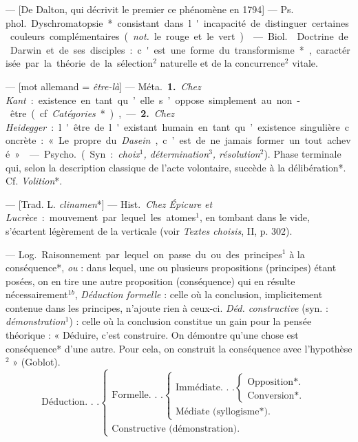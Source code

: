 
	\begin{itemize}[leftmargin=1cm, label=, itemsep=1pt]

 — [De Dalton, qui décrivit
le premier ce phénomène en 1794]
— \si{Ps. phol.} Dyschromatopsie* consistant dans l'incapacité de distinguer certaines couleurs complémentaires ({\it not.} le rouge et le vert).

 — \si{Biol.}  Doctrine de
Darwin et de ses disciples : c'est
une forme du transformisme*, caractérisée par la théorie de la sélection$^2$
naturelle et de la concurrence$^2$
vitale.

 — [mot allemand = {\it être-là}] —
\si{Méta.} {\bf 1.} {\it Chez Kant} : existence en
tant qu’elle s’oppose simplement au
non-être (cf. {\it Catégories}*), — {\bf 2.} {\it Chez
Heidegger} : l'être de l'existant
humain en tant qu’existence singulière concrète : « Le propre du {\it Dasein},
c’est de ne jamais former un tout
achevé. »

 — \si{Psycho.} (Syn. : {\it choix$^1$,
détermination$^3$, résolution}$^2$). Phase
terminale qui, selon la description
classique de l’acte volontaire, succède à la délibération*. Cf. {\it Volition}*.

 — [Trad. L. {\it clinamen}*] —
\si{Hist.} {\it Chez Épicure et Lucrèce} : mouvement par lequel les atomes$^1$, en
tombant dans le vide, s’écartent
légèrement de la verticale (voir
{\it Textes choisis}, II, p. 302).

 — \si{Log.} Raisonnement
par lequel on passe du ou des principes$^1$ à la conséquence*, {\it ou} : dans
lequel, une ou plusieurs propositions (principes) étant posées, on en
tire une autre proposition (conséquence) qui en résulte
nécessairement$^{1b}$, {\it Déduction formelle} : celle où
la conclusion, implicitement contenue dans les principes, n’ajoute
rien à ceux-ci. {\it Déd. constructive}
(syn. : {\it démonstration}$^1$) : celle où la
conclusion constitue un gain pour la
pensée théorique : « Déduire, c’est
construire. On démontre qu’une
chose est conséquence* d’une autre.
Pour cela, on construit la conséquence avec l'hypothèse$^2$ » (Goblot).
\begin{equation*}
\text{Déduction. . .}
\left\{ \begin{array}{l}
  \text{Formelle. . .}
    \left\{ \begin{array}{l}
      \text{Immédiate. . .}
        \left\{ \begin{array}{l}
          \text{Opposition*. }\\
          \text{Conversion*. }
        \end{array}
        \right. \\
      \text{Médiate (syllogisme*).}
    \end{array}
    \right. \\
  \text{Constructive (démonstration).}
\end{array}
\right.
\end{equation*}


\end{itemize}

